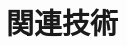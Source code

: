 \chapter{関連技術}

\begin{comment}
　近年，大学や企業，教育機関で利用されているネットワークシミュレータとして非常に数多くのものが存在するが，それぞれ使用する用途に応じた特徴がある．代表的なネットワークシミュレータとして，ns-2（Network Simulator version 2），ns-3（Network Simulator version 3），GloMoSim（Global Mobile Information SystemSimulator），Qualnet，OPNET Modeler，Scenargie などがあるが\cite{Qualnet1}，本研究では2.1
節に述べるような理由からns-3 を選択する．選択したns-3 を用いて性能評価を行っていくが，シミュレータでネットワークを構築する際やパラメータの設定を行う際には，ネットワークに関する知識が必要不可欠となってくる．その後，シミュレータで構築したネットワークの性能を評価する際，2.3 節で述べるQoS・QoE の考え方が重要となってくる．

本節では，2.1 節で上記シミュレータの説明と比較を行い本研究に適したシミュレータを選択する．2.2 節ではシミュレータ上でネットワークを構築する際に必要となるネットワーク技術について説明する．2.3 節では，性能評価量とQoS・QoE について説明する．

\section{シミュレータの比較}

\subsubsection{ns-2（Network Simulator version 2）}

ns-2 とは，カリフォルニア大学バークレー校（UCB），LBNL，XeroxPARC，および，USC / ISI によるVINT（VirtualInterNetworkTestbed）プロジェクトで開発された離散イベント型のネットワークシミュレータである．オープンソースのフリーソフトウェアであること，無線通信をモデル化したモジュールが利用できるということから，アドホックネットワーク等の無線通信ネットワークのシミュレーションも行うことが可能．
ns-2 では，シミュレーションのためのスケジューラ，ノードやデバイスを表現したオブジェクトの管理，ネットワークプロトコルの実装部分はC ++言語で記述されており，
それらを使ったシミュレーションシナリオを記述する部分はOTcl（ObjectTcl）言語を用いる事もできる．
C ++言語はコンパイラ型であり，実行速度は速いがコード変更の度にコンパイルが必要なため主に処理負荷の重い部分に採用されている．
一方，OTcl 言語はインタプリタ型であり，実行速度は遅いが変更後のコンパイルが不要なためシナリオ記述語として採用されている．
ns-2 において新しいプロトコルを導入する場合は主としてC ++言語を用い，ネットワークトポロジやパラメータの設定にはOTcl 言語を用いる．従ってユーザは2つの語を習得しなければならない．


\end{comment}

